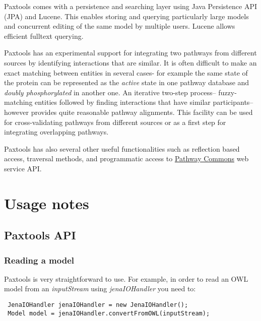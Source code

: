 \documentclass[10pt]{article}
\newenvironment{mylisting}
{\begin{list}{}{\setlength{\leftmargin}{2em}}\item\small\bfseries}
{\end{list}}
\begin{document}
Paxtools comes with a persistence and searching layer using Java Persistence API (JPA) and Lucene. This enables storing and querying particularly large models and concurrent editing of the same model by multiple users. Lucene allows efficient fulltext querying.

Paxtools has an experimental support for integrating two pathways from different sources by identifying interactions that are similar. It is often difficult to make
an exact matching between entities in several cases- for example the same state of the protein can be represented as the \emph{active} state in one pathway database and \emph{doubly phosphorylated} in another one. An iterative two-step process-- fuzzy-matching entities followed by finding interactions that have similar participants-- however provides quite reasonable pathway alignments. This facility can be used for cross-validating pathways from different sources or as a first step for integrating overlapping pathways.

%
%

Paxtools has also several other useful functionalities such as reflection based access, traversal methods, and programmatic access to \href{http://www.pathwaycommons.org}{Pathway Commons} \cite{pathwaycommons} web service API.


\section{Usage notes}

\subsection{Paxtools API}
\subsubsection{Reading a model}
\label{usage:io}
Paxtools is very straightforward to use. For example, in order to read an OWL model from an \textit{inputStream} using \textit{jenaIOHandler} you need to:

\begin{mylisting}
\begin{verbatim}
 JenaIOHandler jenaIOHandler = new JenaIOHandler();
 Model model = jenaIOHandler.convertFromOWL(inputStream);
\end{verbatim}
\end{mylisting}
\end{document}
